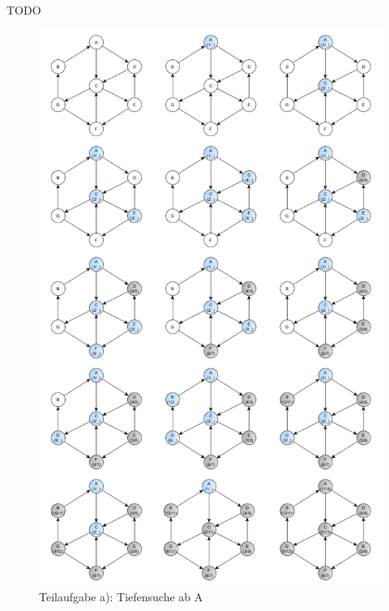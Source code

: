\documentclass[12pt]{scrartcl}
\begin{document}

\exercise{}
TODO

\exercise{}
\begin{figure}[h!]
\begin{center}
\includegraphics[scale=0.5]{ATiefensucheComplete.png}
\caption{Teilaufgabe a): Tiefensuche ab A}
\end{center}
\end{figure}
\end{document}
